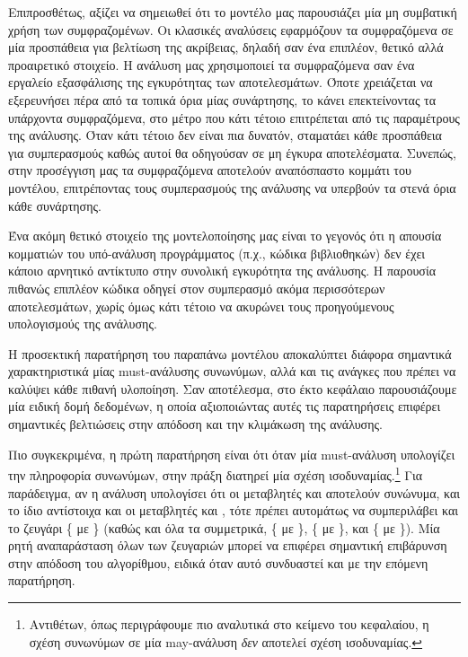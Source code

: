 Επιπροσθέτως, αξίζει να σημειωθεί ότι το μοντέλο μας παρουσιάζει μία μη συμβατική χρήση των συμφραζομένων. Οι κλασικές αναλύσεις εφαρμόζουν τα συμφραζόμενα σε μία προσπάθεια για βελτίωση της ακρίβειας, δηλαδή σαν ένα επιπλέον, θετικό αλλά προαιρετικό στοιχείο. Η ανάλυση μας χρησιμοποιεί τα συμφραζόμενα σαν ένα εργαλείο εξασφάλισης της εγκυρότητας των αποτελεσμάτων. Όποτε χρειάζεται να εξερευνήσει πέρα από τα τοπικά όρια μίας συνάρτησης, το κάνει επεκτείνοντας τα υπάρχοντα συμφραζόμενα, στο μέτρο που κάτι τέτοιο επιτρέπεται από τις παραμέτρους της ανάλυσης. Όταν κάτι τέτοιο δεν είναι πια δυνατόν, σταματάει κάθε προσπάθεια για συμπερασμούς καθώς αυτοί θα οδηγούσαν σε μη έγκυρα αποτελέσματα. Συνεπώς, στην προσέγγιση μας τα συμφραζόμενα αποτελούν αναπόσπαστο κομμάτι του μοντέλου, επιτρέποντας τους συμπερασμούς της ανάλυσης να υπερβούν τα στενά όρια κάθε συνάρτησης.

Ένα ακόμη θετικό στοιχείο της μοντελοποίησης μας είναι το γεγονός ότι η απουσία κομματιών του υπό-ανάλυση προγράμματος (π.χ., κώδικα βιβλιοθηκών) δεν έχει κάποιο αρνητικό αντίκτυπο στην συνολική εγκυρότητα της ανάλυσης. Η παρουσία πιθανώς επιπλέον κώδικα οδηγεί στον συμπερασμό ακόμα περισσότερων αποτελεσμάτων, χωρίς όμως κάτι τέτοιο να ακυρώνει τους προηγούμενους υπολογισμούς της ανάλυσης.


Η προσεκτική παρατήρηση του παραπάνω μοντέλου αποκαλύπτει διάφορα σημαντικά χαρακτηριστικά μίας {\en must-}ανάλυσης συνωνύμων, αλλά και τις ανάγκες που πρέπει να καλύψει κάθε πιθανή υλοποίηση. Σαν αποτέλεσμα, στο έκτο κεφάλαιο παρουσιάζουμε μία ειδική δομή δεδομένων, η οποία αξιοποιώντας αυτές τις παρατηρήσεις επιφέρει σημαντικές βελτιώσεις στην απόδοση και την κλιμάκωση της ανάλυσης.

Πιο συγκεκριμένα, η πρώτη παρατήρηση είναι ότι όταν μία {\en must-}ανάλυση υπολογίζει την πληροφορία συνωνύμων, στην πράξη διατηρεί μία σχέση ισοδυναμίας.\footnote{Αντιθέτων, όπως περιγράφουμε πιο αναλυτικά στο κείμενο του κεφαλαίου, η σχέση συνωνύμων σε μία {\en may-}ανάλυση \emph{δεν} αποτελεί σχέση ισοδυναμίας.} Για παράδειγμα, αν η ανάλυση υπολογίσει ότι οι μεταβλητές {\en {}} και {\en {}} αποτελούν συνώνυμα, και το ίδιο αντίστοιχα και οι μεταβλητές {\en {}} και {\en {}}, τότε πρέπει αυτομάτως να συμπεριλάβει και το ζευγάρι \{{\en {}} με {\en {}}\} (καθώς και όλα τα συμμετρικά, \{{\en {}} με {\en {}}\}, \{{\en {}} με {\en {}}\}, και \{{\en {}} με {\en {}}\}). Μία ρητή αναπαράσταση όλων των ζευγαριών μπορεί να επιφέρει σημαντική επιβάρυνση στην απόδοση του αλγορίθμου, ειδικά όταν αυτό συνδυαστεί και με την επόμενη παρατήρηση.

